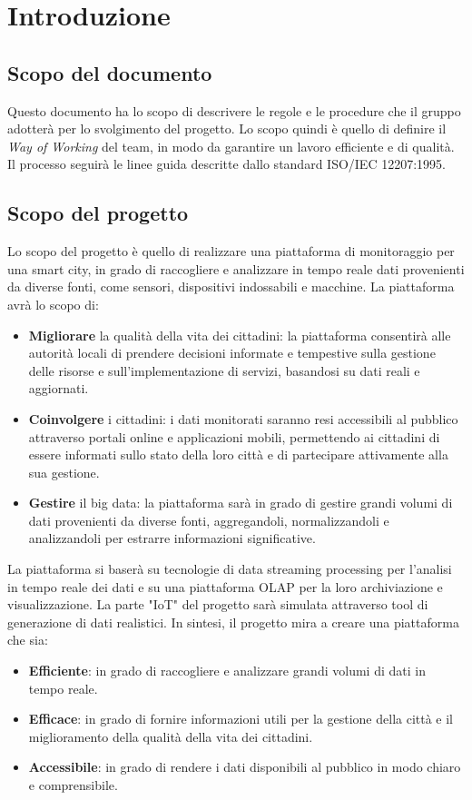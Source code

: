 \section{Introduzione}
\subsection{Scopo del documento}
Questo documento ha lo scopo di descrivere le regole e le procedure che il gruppo adotterà per lo svolgimento del progetto. Lo scopo quindi è quello di definire il \textit{Way of Working} del team, in modo da garantire un lavoro efficiente e di qualità.\\
Il processo seguirà le linee guida descritte dallo standard ISO/IEC 12207:1995.

\subsection{Scopo del progetto}
Lo scopo del progetto è quello di realizzare una piattaforma di monitoraggio per una smart city, in grado di raccogliere e analizzare in tempo reale dati provenienti da diverse fonti, come sensori, dispositivi indossabili e macchine. La piattaforma avrà lo scopo di:
\begin{itemize}
	\itemsep0em
    \item \textbf{Migliorare} la qualità della vita dei cittadini: la piattaforma consentirà alle autorità locali di prendere decisioni informate e tempestive sulla gestione delle risorse e sull'implementazione di servizi, basandosi su dati reali e aggiornati.
    \item \textbf{Coinvolgere} i cittadini: i dati monitorati saranno resi accessibili al pubblico attraverso portali online e applicazioni mobili, permettendo ai cittadini di essere informati sullo stato della loro città e di partecipare attivamente alla sua gestione.
    \item \textbf{Gestire} il big data: la piattaforma sarà in grado di gestire grandi volumi di dati provenienti da diverse fonti, aggregandoli, normalizzandoli e analizzandoli per estrarre informazioni significative.
\end{itemize}
La piattaforma si baserà su tecnologie di data streaming processing per l'analisi in tempo reale dei dati e su una piattaforma OLAP per la loro archiviazione e visualizzazione. La parte "IoT" del progetto sarà simulata attraverso tool di generazione di dati realistici.
In sintesi, il progetto mira a creare una piattaforma che sia:
\begin{itemize}
    \item \textbf{Efficiente}: in grado di raccogliere e analizzare grandi volumi di dati in tempo reale.
    \item \textbf{Efficace}: in grado di fornire informazioni utili per la gestione della città e il miglioramento della qualità della vita dei cittadini.
    \item \textbf{Accessibile}: in grado di rendere i dati disponibili al pubblico in modo chiaro e comprensibile.
\end{itemize}

